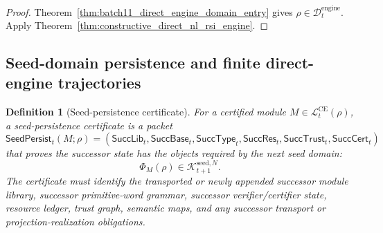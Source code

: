 \documentclass[11pt]{article}
\newtheorem{definition}[theorem]{Definition}
\newcommand{\Lcal}{\mathcal{L}}
\newcommand{\1}{\mathbf{1}}
\providecommand{\Dcal}{\mathcal{D}}
\providecommand{\Kcal}{\mathcal{K}}
\begin{document}
\begin{proof}
Theorem~\ref{thm:batch11_direct_engine_domain_entry} gives \(\rho\in\Dcal_t^{\mathrm{engine}}\).  Apply Theorem~\ref{thm:constructive_direct_nl_rsi_engine}.
\end{proof}

\subsection{Seed-domain persistence and finite direct-engine trajectories}

\begin{definition}[Seed-persistence certificate]
\label{def:batch11_seed_persistence_certificate}
For a certified module \(M\in\Lcal_t^{\mathrm{CE}}(\rho)\), a seed-persistence certificate is a packet
\[
\mathsf{SeedPersist}_t(M;\rho)
=
(\mathsf{SuccLib}_t,\mathsf{SuccBase}_t,\mathsf{SuccType}_t,\mathsf{SuccRes}_t,\mathsf{SuccTrust}_t,\mathsf{SuccCert}_t)
\]
that proves the successor state has the objects required by the next seed domain:
\[
\Phi_M(\rho)\in\Kcal_{t+1}^{\mathrm{seed},N}.
\]
The certificate must identify the transported or newly appended successor module library, successor primitive-word grammar, successor verifier/certifier state, resource ledger, trust graph, semantic maps, and any successor transport or projection-realization obligations.
\end{definition}
\end{document}
